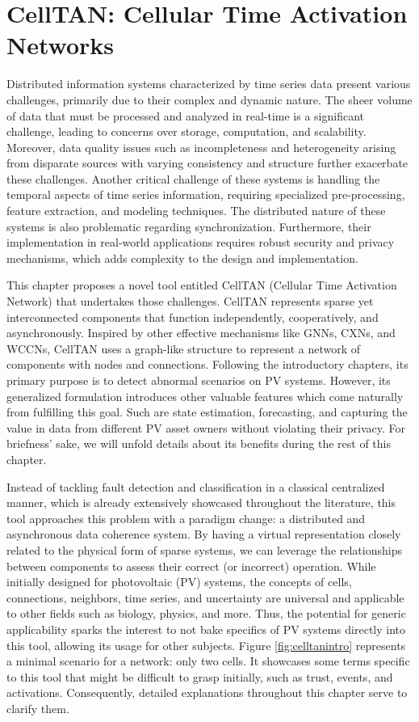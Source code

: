 \chapter{CellTAN: Cellular Time Activation Networks} \label{chap:chap4}

Distributed information systems characterized by time series data present various challenges, primarily due to their complex and dynamic nature. The sheer volume of data that must be processed and analyzed in real-time is a significant challenge, leading to concerns over storage, computation, and scalability. Moreover, data quality issues such as incompleteness and heterogeneity arising from disparate sources with varying consistency and structure further exacerbate these challenges. Another critical challenge of these systems is handling the temporal aspects of time series information, requiring specialized pre-processing, feature extraction, and modeling techniques. The distributed nature of these systems is also problematic regarding synchronization. Furthermore, their implementation in real-world applications requires robust security and privacy mechanisms, which adds complexity to the design and implementation.

This chapter proposes a novel tool entitled CellTAN (Cellular Time Activation Network) that undertakes those challenges. CellTAN represents sparse yet interconnected components that function independently, cooperatively, and asynchronously. Inspired by other effective mechanisms like GNNs, CXNs, and WCCNs, CellTAN uses a graph-like structure to represent a network of components with nodes and connections. Following the introductory chapters, its primary purpose is to detect abnormal scenarios on PV systems. However, its generalized formulation introduces other valuable features which come naturally from fulfilling this goal. Such are state estimation, forecasting, and capturing the value in data from different PV asset owners without violating their privacy. For briefness' sake, we will unfold details about its benefits during the rest of this chapter.

Instead of tackling fault detection and classification in a classical centralized manner, which is already extensively showcased throughout the literature, this tool approaches this problem with a paradigm change: a distributed and asynchronous data coherence system. By having a virtual representation closely related to the physical form of sparse systems, we can leverage the relationships between components to assess their correct (or incorrect) operation. While initially designed for photovoltaic (PV) systems, the concepts of cells, connections, neighbors, time series, and uncertainty are universal and applicable to other fields such as biology, physics, and more. Thus, the potential for generic applicability sparks the interest to not bake specifics of PV systems directly into this tool, allowing its usage for other subjects. Figure \ref{fig:celltanintro} represents a minimal scenario for a network: only two cells. It showcases some terms specific to this tool that might be difficult to grasp initially, such as trust, events, and activations. Consequently, detailed explanations throughout this chapter serve to clarify them.

